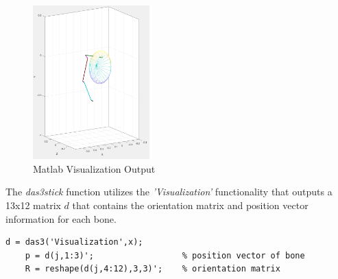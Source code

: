 \begin{figure}[h]
    \centering
    \includegraphics[width=0.4\textwidth]{Pictures/DAS/das3stick.png}
    \caption{Matlab Visualization Output}
    \label{fig:das3stick}
\end{figure}

The \textit{das3stick} function utilizes the \textit{'Visualization'} functionality that outputs a 13x12 matrix $d$ that contains the orientation matrix and position vector information for each bone.

\begin{lstlisting}[style=Matlab-editor]
    d = das3('Visualization',x);   
    p = d(j,1:3)';					% position vector of bone
    R = reshape(d(j,4:12),3,3)';	% orientation matrix
 \end{lstlisting}


